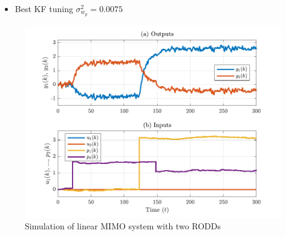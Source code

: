 \begin{itemize}
	\item Best KF tuning $\sigma_{w_p}^2=0.0075$
\end{itemize}

\begin{figure}[htp]
	\centering
	\includegraphics[width=13cm]{images/rod_obs_sim2_ioplot.pdf}
	\caption{Simulation of linear MIMO system with two RODDs}
	\label{fig:rod-obs-sim-2-ioplot}
\end{figure}

